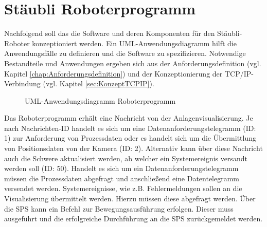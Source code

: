 \documentclass[ a4paper,
                oneside,
                toc=bibliography,
                toc=listof
                ]{scrbook}
\begin{document}
	\section{Stäubli Roboterprogramm}
	Nachfolgend soll das die Software und deren Komponenten für den Stäubli-Roboter konzeptioniert werden. Ein UML-Anwendungsdiagramm hilft die Anwendungsfälle zu definieren und die Software zu spezifizieren. Notwendige Bestandteile und Anwendungen ergeben sich aus der Anforderungsdefinition (vgl. Kapitel \ref{chap:Anforderungsdefinition}) und der Konzeptionierung der TCP/IP-Verbindung (vgl. Kapitel \ref{sec:KonzeptTCPIP}).
	\begin{figure}[h!]
		\centering
		\caption{UML-Anwendungsdiagramm Roboterprogramm}
		\label{fig:UML_Use_Case_Robo}
	\end{figure}
	Das Roboterprogramm erhält eine Nachricht von der Anlagenvisualisierung. Je nach Nachrichten-ID handelt es sich um eine Datenanforderungstelegramm (ID: 1) zur Anforderung von Prozessdaten oder es handelt sich um die Übermittlung von Positionsdaten von der Kamera (ID: 2). Alternativ kann über diese Nachricht auch die Schwere aktualisiert werden, ab welcher ein Systemereignis versandt werden soll (ID: 50). Handelt es sich um ein Datenanforderungstelegramm müssen die Prozessdaten abgefragt und anschließend eine Datentelegramm versendet werden. Systemereignisse, wie z.B. Fehlermeldungen sollen an die Visualisierung übermittelt werden. Hierzu müssen diese abgefragt werden. Über die SPS kann ein Befehl zur Bewegungsausführung erfolgen. Dieser muss ausgeführt und die erfolgreiche Durchführung an die SPS zurückgemeldet werden.\\
\end{document}
